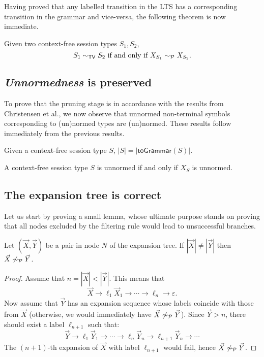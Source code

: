 Having proved that any labelled transition in the LTS has a corresponding
transition in the grammar and vice-versa, the following theorem is now 
immediate.

\begin{theorem}
\label{cfst_vs_grammar}
	Given two context-free session types $S_1, S_2$,
	\[ S_1 \sim_{\mathsf{TV}} S_2 \text{ if and only if } X_{S_1} \sim_{\mathcal{P}} X_{S_2}. \]
\end{theorem}

\subsection{\textit{Unnormedness} is preserved}

To prove that the pruning stage is in accordance with the results 
from Christensen et al., we now observe that unnormed non-terminal symbols 
corresponding to (un)normed types are (un)normed. These results follow 
immediately from the previous results. 

\begin{corollary}
	Given a context-free session type $S$, $|S| = |\mathsf{toGrammar}(S)|$.
\end{corollary}

\begin{corollary}
	A context-free session type $S$ is unnormed if and only if 
	$X_S$ is unnormed.
\end{corollary}

\subsection{The expansion tree is correct}

Let us start by proving a small lemma, whose ultimate purpose 
stands on proving that all nodes excluded by the filtering rule
would lead to unsuccessful branches.

\begin{lemma}
\label{lemma:filtering}
	Let $(\vec X, \vec Y)$ be a pair in node $N$ of the expansion tree. 
	If $|\vec X| \neq |\vec Y|$ then  $\vec X \not\sim_{\mathcal{P}} \vec Y$.
\end{lemma}

\begin{proof}
	Assume that $n = |\vec X| < |\vec Y|$. This means that 
	\[\vec X \rightarrow \ell_1 \vec X_1 \rightarrow \cdots 
	\rightarrow \ell_n \rightarrow \varepsilon.\]
	Now assume that $\vec Y$ has an expansion sequence whose 
	labels coincide with those from $\vec X$ (otherwise, we would immediately have
	$\vec X \not\sim_{\mathcal{P}} \vec Y$). Since $\vec Y > n$, there should exist a label
	$\ell_{n+1}$ such that:
	\[\vec Y \rightarrow \ell_1 \vec Y_1 \rightarrow \cdots 
	\rightarrow \ell_n \vec Y_n\rightarrow \ell_{n+1} \vec Y_n \rightarrow \cdots\]
	The $(n+1)$-th expansion of $\vec X$ with label $\ell_{n+1}$ would fail, 
	hence $\vec X \not\sim_{\mathcal{P}} \vec Y$.
\end{proof}

